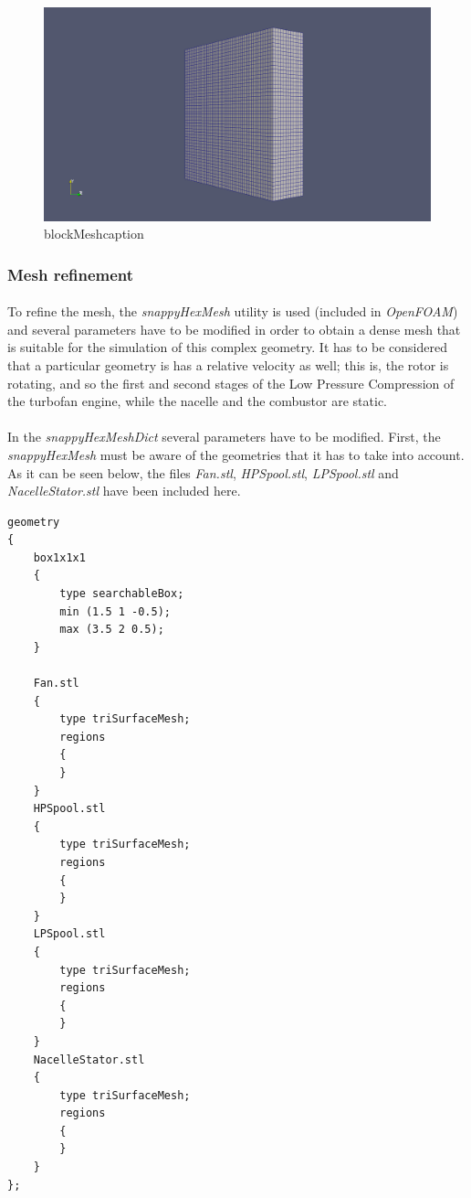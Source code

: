 \begin{figure}[h!]
\includegraphics[scale=0.26]{./mesh/screenshots/blockmesh}
\centering
\caption{blockMeshcaption}
\label{blockMeshcaption}
\end{figure}

\subsubsection{Mesh refinement}

\paragraph{}To refine the mesh, the \textit{snappyHexMesh} utility is used (included in \textit{OpenFOAM}) and several parameters have to be modified in order to obtain a dense mesh that is suitable for the simulation of this complex geometry. It has to be considered that a particular geometry is has a relative velocity as well; this is, the rotor is rotating, and so the first and second stages of the Low Pressure Compression of the turbofan engine, while the nacelle and the combustor are static. 

\paragraph{}In the \textit{snappyHexMeshDict} several parameters have to be modified. First, the \textit{snappyHexMesh} must be aware of the geometries that it has to take into account. As it can be seen below, the files \textit{Fan.stl}, \textit{HPSpool.stl}, \textit{LPSpool.stl} and \textit{NacelleStator.stl} have been included here.

\begin{footnotesize}
\begin{verbatim}
geometry
{
    box1x1x1
    {
        type searchableBox;
        min (1.5 1 -0.5);
        max (3.5 2 0.5);
    }

    Fan.stl
    {
        type triSurfaceMesh;
        regions
        {
        }
    }
    HPSpool.stl
    {
        type triSurfaceMesh;
        regions
        {
        }
    }
    LPSpool.stl
    {
        type triSurfaceMesh;
        regions
        {
        }
    }
    NacelleStator.stl
    {
        type triSurfaceMesh;
        regions
        {
        }
    }
};
\end{verbatim}
\end{footnotesize}

